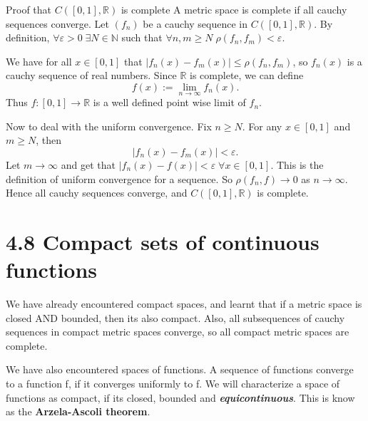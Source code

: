 \documentclass[a4paper,norsk]{article}
\renewcommand{\geq}{\geqslant}
\renewcommand{\leq}{\leqslant}
\renewcommand{\epsilon}{\varepsilon}
\begin{document}
\begin{proofbox}{Proof that $ C \left( \left[ 0, 1 \right] , \mathbb{R} \right)  $ is complete }{}
  A metric space is complete if all cauchy sequences converge. Let $ \left( f_n \right)  $ be a cauchy sequence in $ C \left( \left[ 0, 1 \right] , \mathbb{R} \right)  $. By definition, $ \forall   \epsilon > 0 \; \exists  N \in \mathbb{N} $ such that $ \forall n, m \geq  N \; \rho \left( f_n, f_m \right) < \epsilon  $. 
  
  We have for all $ x \in  \left[ 0, 1 \right]  $ that $ \left| f_n(x) - f_m(x) \right| \leq  \rho \left( f_n, f_m \right)  $, so $ f_n(x) $ is a cauchy sequence of real numbers. Since $ \mathbb{R} $  is complete, we can define 
  \[
      f(x) := \lim_{n \to \infty} f_n(x).
  \]
  Thus $ f: \left[ 0, 1 \right] \to \mathbb{R} $  is a well defined point wise limit of $ f_n $. 
  
  
  
  Now to deal with the uniform convergence. Fix $ n \geq  N $. For any $ x \in \left[ 0, 1 \right]  $   and $ m \geq  N $, then
  \[
      \left| f_n(x) - f_m(x) \right| < \epsilon.
  \]
  Let $ m \to \infty $ and get that $ \left| f_n(x) - f(x)  \right| < \epsilon  \; \forall x \in \left[ 0, 1 \right]  $. This is the definition of uniform convergence for a sequence. So $ \rho \left( f_n, f \right) \to 0 $ as $ n \to \infty $. Hence all cauchy sequences converge, and $ C \left( \left[ 0, 1 \right] , \mathbb{R} \right)  $ is complete.
  
\end{proofbox}


\section*{4.8 Compact sets of continuous functions}


We have already encountered compact spaces, and learnt that if a metric space is closed AND bounded, then its also compact. Also, all subsequences of cauchy sequences in compact metric spaces converge, so all compact metric spaces are complete.


We have also encountered spaces of functions. A sequence of functions converge to a function f, if it converges uniformly to f. We will characterize a space of functions as compact, if its closed, bounded and \textit{\textbf{equicontinuous}}. This is know as the \textbf{Arzela-Ascoli theorem}.
\end{document}
